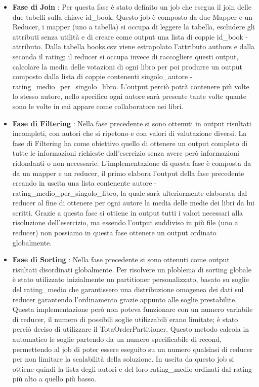 \begin{itemize} %
    \item \textbf{ Fase di Join }: Per questa fase è stato definito un job che esegua il join delle due tabelli sulla chiave
    id\_book. Questo job è composto da due Mapper e un Reducer, i mapper (uno a tabella) si occupa di leggere la tabella, escludere
    gli attributi senza utilità e di creare come output una lista di coppie id\_book - attributo.
    Dalla tabella books.csv viene estrapolato l'attributo authors e dalla seconda il rating; il reducer si occupa invece
    di raccogliere questi output, calcolare la media delle votazioni di ogni libro per poi produrre un output composto dalla
    lista di coppie contenenti singolo\_autore - rating\_medio\_per\_singolo\_libro. L'output perciò potrà contenere più volte lo stesso
    autore, nello specifico ogni autore sarà presente tante volte quante sono le volte in cui appare come collaboratore nei libri.

    \item \textbf{Fase di Filtering } : Nella fase precedente si sono ottenuti in output risultati incompleti, con autori che si
    ripetono e con valori di valutazione diversi. La fase di Filtering ha come obiettivo quello di ottenere un output
    completo di tutte le informazioni richieste dall'esercizio senza avere però informazioni ridondanti o non necessarie.
    L'implementazione di questa fase è composta da da un mapper e un reducer, il primo elabora l'output della fase precedente creando
    in uscita una lista contenente autore - rating\_medio\_per\_singolo\_libro, la quale sarà ulteriormente elaborata dal reducer al fine di ottenere
    per ogni autore la media delle medie dei libri da lui scritti.
    Grazie a questa fase si ottiene in output tutti i valori necessari alla risoluzione dell'esercizio, ma essendo l'output suddiviso in più file
    (uno a reducer) non possiamo in questa fase ottenere un output ordinato globalmente.

    \item \textbf{Fase di Sorting} : Nella fase precedente si sono ottenuti come output risultati disordinati globalmente.
    Per risolvere un ploblema di sorting globale è stato utilizzato inizialmente un partitioner personalizzato, basato su soglie del rating\_medio
    che garantissero una distribuzione omogenea dei dati sul reducer garantendo l'ordinamento grazie appunto alle soglie prestabilite.
    Questa implementazione però non poteva funzionare con un numero variabile di reducer, il numero di possibili soglie utilizzabili erano limitate;
    è stato perciò deciso di utilizzare il TotaOrderPartitioner.
    Questo metodo calcola in automatico le soglie partendo da un numero specificabile di recond, permettendo al job di poter essere eseguito su un numero qualsiasi
    di reducer per non limitare la scalabilità della soluzione.
    In uscita da questo job si ottiene quindi la lista degli autori e del loro rating\_medio ordinati dal rating più alto a quello più basso.
    \end{itemize}

